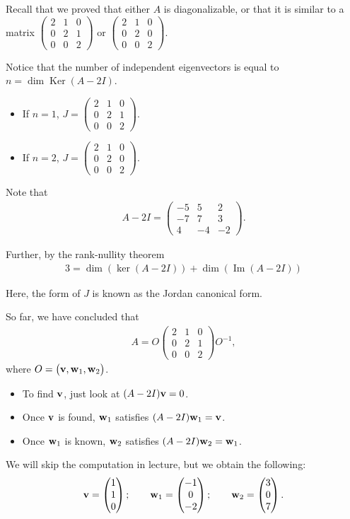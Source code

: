 \documentclass{article}
\newcommand{\mat}[1]{\begin{pmatrix}#1\end{pmatrix}}
\DeclareMathOperator{\Ker}{Ker}
\DeclareMathOperator{\ImT}{Im}
\begin{document}
Recall that we proved that either $A$ is diagonalizable, or that it is similar to a matrix $\mat{2 & 1 & 0 \\ 0 & 2 & 1 \\ 0 & 0 & 2}$ or $\mat{2 & 1 & 0 \\ 0 & 2 & 0 \\ 0 & 0 & 2}$.

Notice that the number of independent eigenvectors is equal to $n = \dim \Ker \left( A - 2 I \right)$.

\begin{itemize}
  \item If $n = 1$, $J = \mat{2 & 1 & 0 \\ 0 & 2 & 1 \\ 0 & 0 & 2}$.
  \item If $n = 2$, $J = \mat{2 & 1 & 0 \\ 0 & 2 & 0 \\ 0 & 0 & 2}$.
\end{itemize}

Note that
\begin{align*}
  A - 2I = \mat{-5 & 5 & 2 \\ -7 & 7 & 3 \\ 4 & -4 & -2}.
\end{align*}

Further, by the rank-nullity theorem
\begin{align*}
  3 = \dim(\ker(A - 2I)) + \dim(\ImT (A - 2I))
\end{align*}

Here, the form of $J$ is known as the Jordan canonical form.

So far, we have concluded that
\begin{align*}
  A = O \mat{2 & 1 & 0 \\ 0 & 2 & 1 \\ 0 & 0 & 2} O^{-1},
\end{align*}
where $O = \mat{\mbf{v}, \mbf{w}_1, \mbf{w}_2}$.  

\begin{itemize}
  \item To find $\mathbf{v}$, just look at $(A - 2I) \mathbf{v} = 0$.
  \item Once $\mathbf{v}$ is found, $\mathbf{w}_1$ satisfies $(A - 2I) \mathbf{w}_1 = \mathbf{v}$.
  \item Once $\mathbf{w}_1$ is known, $\mathbf{w}_2$ satisfies $(A - 2I) \mathbf{w}_2 = \mathbf{w}_1$.
\end{itemize}

We will skip the computation in lecture, but we obtain the following:
\begin{align*}
  \mbf{v} = \mat{1 \\ 1 \\ 0}; \qquad \mbf{w}_1 = \mat{-1 \\ 0 \\ -2}; \qquad \mbf{w}_2 = \mat{3 \\ 0 \\ 7}.
\end{align*}
\end{document}
